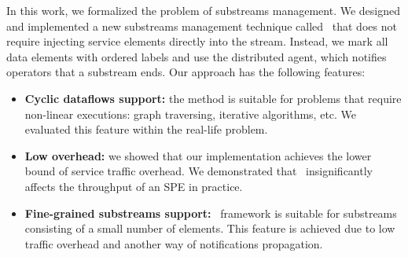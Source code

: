 In this work, we formalized the problem of substreams management. We designed and implemented a new substreams management technique called \tracker\ that does not require injecting service elements directly into the stream. Instead, we mark all data elements with ordered labels and use the distributed agent, which notifies operators that a substream ends. Our approach has the following features:

\begin{itemize}
     \item {\bf Cyclic dataflows support:} the method is suitable for problems that require non-linear executions: graph traversing, iterative algorithms, etc. We evaluated this feature within the real-life problem.
     \item {\bf Low overhead:} we showed that our implementation achieves the lower bound of service traffic overhead. We demonstrated that \tracker\ insignificantly affects the throughput of an SPE in practice.
     \item {\bf Fine-grained substreams support:} \tracker\ framework is suitable for substreams consisting of a small number of elements. This feature is achieved due to low traffic overhead and another way of notifications propagation.
\end{itemize}




